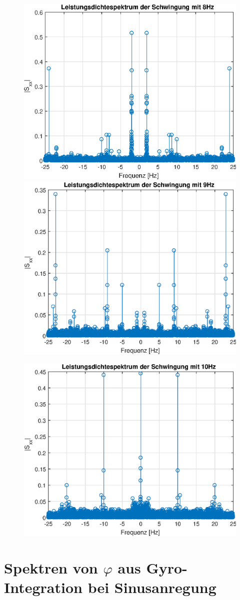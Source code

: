 \documentclass{article}
\begin{document}
\begin{figure}[h!]
\includegraphics[width=0.5\linewidth]{img/lds_sinefreq_8}
\includegraphics[width=0.5\linewidth]{img/lds_sinefreq_9}
\end{figure}
\begin{figure}[h!]
\centering
\includegraphics[width=0.5\linewidth]{img/lds_sinefreq_10}
\end{figure}


\newpage
\section{Spektren von $\varphi$ aus Gyro-Integration bei Sinusanregung}
\end{document}
